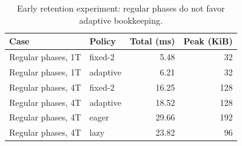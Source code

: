 \begin{table}[t]
\caption{Early retention experiment: regular phases do not favor adaptive bookkeeping.}\label{tab:adaptive}
\centering\small
\begin{tabular}{llrr}\toprule
Case & Policy & Total (ms) & Peak (KiB) \\ \midrule
Regular phases, 1T & fixed-2 & 5.48 & 32 \\
Regular phases, 1T & adaptive & 6.21 & 32 \\
Regular phases, 4T & fixed-2 & 16.25 & 128 \\
Regular phases, 4T & adaptive & 18.52 & 128 \\
Regular phases, 4T & eager & 29.66 & 192 \\
Regular phases, 4T & lazy & 23.82 & 96 \\
\bottomrule\end{tabular}
\end{table}
